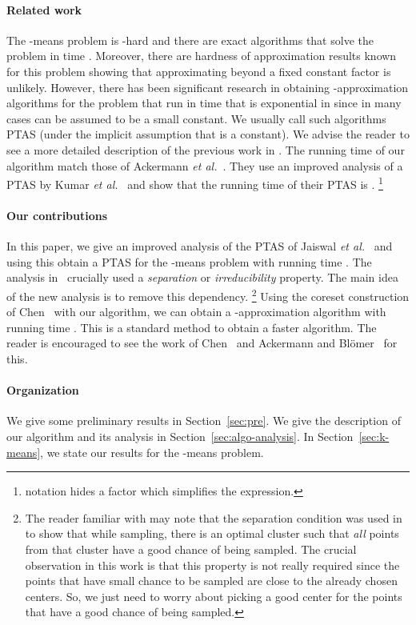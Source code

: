 \documentclass[11pt]{article}
\newcommand{\etal}{{\it et al.}}
\begin{document}
\paragraph{Related work}
The -means problem is -hard and there are exact algorithms that solve the problem in time .
Moreover, there are hardness of approximation results known for this problem showing that approximating beyond a fixed constant factor is unlikely. 
However, there has been significant research in obtaining -approximation algorithms for the problem that run in time that is exponential in  since in many cases  can be assumed to be a small constant.
We usually call such algorithms PTAS (under the implicit assumption that  is a constant).
We advise the reader to see a more detailed description of the previous work in \cite{jks12}.
The running time of our algorithm match those of Ackermann \etal~\cite{abs10}.
They use an improved analysis of a PTAS by Kumar \etal~\cite{KumarSS10} and show that the running time of their PTAS is .
\footnote{ notation hides a  factor which simplifies the expression.}


\paragraph{Our contributions} 
In this paper, we give an improved analysis of the PTAS of Jaiswal \etal~\cite{jks12} and using this obtain a PTAS for the -means problem with running time . 
The analysis in~\cite{jks12} crucially used a {\em separation} or {\em irreducibility} property. 
The main idea of the new analysis is to remove this dependency.
\footnote{The reader familiar with \cite{jks12} may note that the separation condition was used in \cite{jks12} to show that while sampling, there is an optimal cluster such that {\em all} points from that cluster have a good chance of being sampled.
The crucial observation in this work is that this property is not really required since the points that have small chance to be sampled are close to the already chosen centers. 
So, we just need to worry about picking a good center for the points that have a good chance of being sampled.}
Using the coreset construction of Chen~\cite{Chen09} with our algorithm, we can obtain a -approximation algorithm with running time .
This is a standard method to obtain a faster algorithm.
The reader is encouraged to see the work of Chen~\cite{Chen09} and Ackermann and Bl\"{o}mer~\cite{ab10} for this.


\paragraph{Organization} We give some preliminary results in Section~\ref{sec:pre}. We give the description of our algorithm and its analysis in Section~\ref{sec:algo-analysis}. In Section~\ref{sec:k-means}, we state our results for the -means problem.
\end{document}
